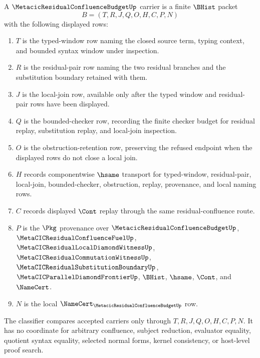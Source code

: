 \begin{definition}
\label{def:metacic-residual-confluence-budget-carrier}
A $\MetacicResidualConfluenceBudgetUp$ carrier is a finite $\BHist$ packet
$$
B=(T,R,J,Q,O,H,C,P,N)
$$
with the following displayed rows:
\begin{enumerate}
\item $T$ is the typed-window row naming the closed source term, typing context, and bounded syntax window under inspection.
\item $R$ is the residual-pair row naming the two residual branches and the substitution boundary retained with them.
\item $J$ is the local-join row, available only after the typed window and residual-pair rows have been displayed.
\item $Q$ is the bounded-checker row, recording the finite checker budget for residual replay, substitution replay, and local-join inspection.
\item $O$ is the obstruction-retention row, preserving the refused endpoint when the displayed rows do not close a local join.
\item $H$ records componentwise $\hsame$ transport for typed-window, residual-pair, local-join, bounded-checker, obstruction, replay, provenance, and local naming rows.
\item $C$ records displayed $\Cont$ replay through the same residual-confluence route.
\item $P$ is the $\Pkg$ provenance over $\MetacicResidualConfluenceBudgetUp$, $\MetaCICResidualConfluenceFuelUp$, $\MetaCICResidualLocalDiamondWitnessUp$, $\MetaCICResidualCommutationWitnessUp$, $\MetaCICResidualSubstitutionBoundaryUp$, $\MetaCICParallelDiamondFrontierUp$, $\BHist$, $\hsame$, $\Cont$, and $\NameCert$.
\item $N$ is the local $\NameCert_{\MetacicResidualConfluenceBudgetUp}$ row.
\end{enumerate}
The classifier compares accepted carriers only through $T,R,J,Q,O,H,C,P,N$. It has no coordinate for arbitrary confluence, subject reduction, evaluator equality, quotient syntax equality, selected normal forms, kernel consistency, or host-level proof search.
\end{definition}

